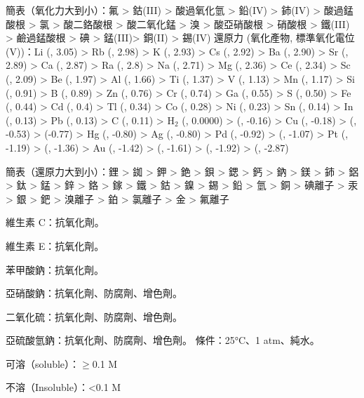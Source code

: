 \documentclass[a4paper,12pt]{report}
\begin{document}
簡表（氧化力大到小）：氟 > 鈷(III) > 酸過氧化氫 > 鉛(IV) > 鈰(IV) > 酸過錳酸根 > 氯 > 酸二鉻酸根 > 酸二氧化錳 > 溴 > 酸亞硝酸根 > 硝酸根  > 鐵(III) > 鹼過錳酸根 > 碘 > 錳(III)> 銅(II) > 錫(IV)
還原力 (氧化產物, 標準氧化電位 (V))：Li (, 3.05) > Rb (, 2.98) > K (, 2.93) > Cs (, 2.92) > Ba (, 2.90) > Sr (, 2.89) > Ca (, 2.87) > Ra (, 2.8) > Na (, 2.71) > Mg (, 2.36) > Ce (, 2.34) > Sc (, 2.09) > Be (, 1.97) > Al (, 1.66) > Ti (, 1.37) > V (, 1.13) > Mn (, 1.17) > Si (, 0.91) > B (, 0.89) > Zn (, 0.76) > Cr (, 0.74) > Ga (, 0.55) > S (, 0.50) > Fe (, 0.44) > Cd (, 0.4) > Tl (, 0.34) > Co (, 0.28) > Ni (, 0.23) > Sn (, 0.14) > In (, 0.13) > Pb (, 0.13) > C (, 0.11) > H$_2$ (, 0.0000) >  (, -0.16) > Cu (, -0.18) >  (, -0.53) >  (-0.77) > Hg (, -0.80) > Ag (, -0.80) > Pd (, -0.92) >  (, -1.07) > Pt (, -1.19) >  (, -1.36) > Au (, -1.42) >  (, -1.61) >  (, -1.92) >  (, -2.87)

簡表（還原力大到小）：鋰 > 銣 > 鉀 > 銫 > 鋇 > 鍶 > 鈣 > 鈉 > 鎂 > 鈰 > 鋁 > 鈦 > 錳 > 鋅 > 鉻 > 鎵 > 鐵 > 鈷 > 鎳 > 錫 > 鉛 > 氫 > 銅 > 碘離子 > 汞 > 銀 > 鈀 > 溴離子 > 鉑 > 氯離子 > 金 > 氟離子
\bit
\item 維生素 C：抗氧化劑。
\item 維生素 E：抗氧化劑。
\item 苯甲酸鈉：抗氧化劑。
\item 亞硝酸鈉：抗氧化劑、防腐劑、增色劑。
\item 二氧化硫：抗氧化劑、防腐劑、增色劑。
\item 亞硫酸氫鈉：抗氧化劑、防腐劑、增色劑。
\eit
{}
條件：25°C、1 atm、純水。

\bit
\item 可溶（soluble）：$\geq$0.1 M
\item 不溶（Insoluble）：<0.1 M
\eit
\end{document}
